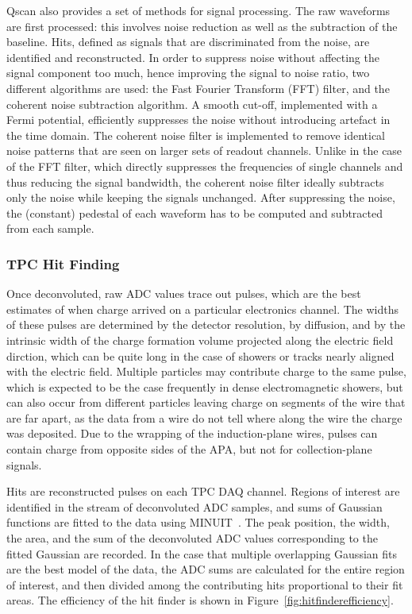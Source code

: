 Qscan also provides a set of methods for signal processing. 
The raw waveforms are first processed: this involves noise reduction as well as the subtraction of the baseline.
Hits, defined as signals that are discriminated from the noise, are identified and reconstructed.
In order to suppress noise without affecting the signal component too much, hence improving the signal to noise ratio, 
two different algorithms are used: the Fast Fourier Transform (FFT) filter, and the coherent noise subtraction algorithm.
A smooth cut-off, implemented with a Fermi potential, efficiently suppresses the noise without introducing artefact in the
time domain.
The coherent noise filter is implemented to remove identical noise patterns that are seen on larger sets of readout channels. 
Unlike in the case of the FFT filter, which directly suppresses the frequencies of single 
channels and thus reducing the signal bandwidth, the coherent noise filter ideally subtracts only the noise while keeping the signals unchanged.
After suppressing the noise, the (constant) pedestal of each waveform has to be computed and subtracted from each sample.


\subsubsection{TPC Hit Finding}

Once deconvoluted, raw ADC values trace out pulses, which are the best
estimates of when charge arrived on a particular electronics channel.
The widths of these pulses are determined by the detector resolution,
by diffusion, and by the intrinsic width of the charge formation
volume projected along the electric field dirction, which can be quite
long in the case of showers or tracks nearly aligned with the electric
field.  Multiple particles may contribute charge to the same pulse,
which is expected to be the case frequently in dense electromagnetic
showers, but can also occur from different particles leaving charge on
segments of the wire that are far apart, as the data from a wire do
not tell where along the wire the charge was deposited.  
Due to the wrapping of the induction-plane wires, pulses can contain charge
from opposite sides of the APA, but not for collection-plane signals.

Hits are reconstructed pulses on each TPC DAQ channel.  Regions of
interest are identified in the stream of deconvoluted ADC samples, and
sums of Gaussian functions are fitted to the data using
MINUIT~\cite{minuit}.  The peak position, the width, the area, and the
sum of the deconvoluted ADC values corresponding to the fitted
Gaussian are recorded.  In the case that multiple overlapping Gaussian
fits are the best model of the data, the ADC sums are calculated for
the entire region of interest, and then divided among the contributing
hits proportional to their fit areas.  The efficiency of the hit
finder is shown in Figure~\ref{fig:hitfinderefficiency}.

